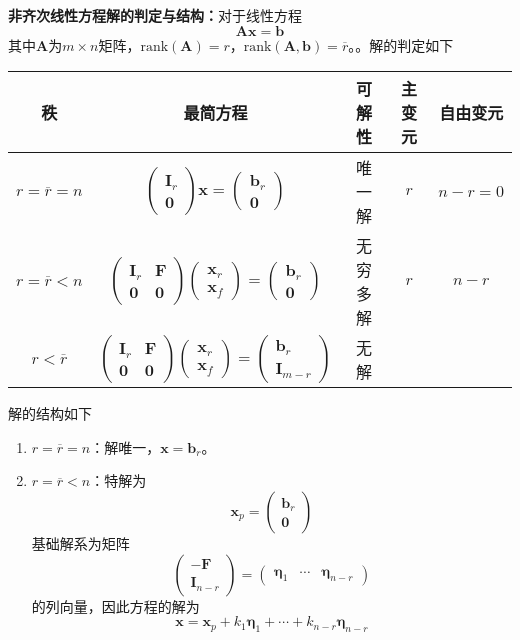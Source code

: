 \documentclass[lang = cn, scheme = chinese, thmcnt = section]{elegantbook}
\newcommand{\bs}{\boldsymbol}          %
\newcommand{\rank}{\text{rank}}        %
\begin{document}
\textbf{非齐次线性方程解的判定与结构：}对于线性方程
$$
\bs{Ax}=\bs{b}
$$
其中$\bs{A}$为$m\times n$矩阵，$\rank(\bs{A})=r$，$\rank(\bs{A},\bs{b})=\overline{r}$。。解的判定如下
\begin{table}[H]
	\centering
	\begin{tabular}{ccccc}
		\toprule
		秩 & 最简方程 & 可解性 & 主变元 & 自由变元 \\
		\midrule
		$r=\overline{r}=n$ & $\begin{pmatrix}\bs{I}_r\\\bs{0}\end{pmatrix}\bs{x}=\begin{pmatrix}\bs{b}_r\\\bs{0}\end{pmatrix}$ & 唯一解 & $r$ & $n-r=0$ \\
		$r=\overline{r}<n$ & $\begin{pmatrix}\bs{I}_r&\bs{F}\\\bs{0}&\bs{0}\end{pmatrix}\begin{pmatrix}\bs{x}_r\\\bs{x}_f\end{pmatrix}=\begin{pmatrix}\bs{b}_r\\\bs{0}\end{pmatrix}$ & 无穷多解 & $r$ & $n-r$ \\
		$r<\overline{r}$ & $\begin{pmatrix}\bs{I}_r&\bs{F}\\\bs{0}&\bs{0}\end{pmatrix}\begin{pmatrix}\bs{x}_r\\\bs{x}_f\end{pmatrix}=\begin{pmatrix}\bs{b}_r\\\bs{I}_{m-r}\end{pmatrix}$ & 无解 & & \\
		\bottomrule
	\end{tabular}
\end{table}
解的结构如下
\begin{enumerate}
	\item $r=\overline{r}=n$：解唯一，$\bs{x}=\bs{b}_r$。
	\item $r=\overline{r}<n$：特解为
	$$
	\bs{x}_p=
	\begin{pmatrix}
		\bs{b}_r\\
		\bs{0}
	\end{pmatrix}
	$$
	基础解系为矩阵
	$$
	\begin{pmatrix}
		-\bs{F}\\
		\bs{I}_{n-r}
	\end{pmatrix}
	=\begin{pmatrix}
		\bs{\eta}_1&\cdots&\bs{\eta}_{n-r}
	\end{pmatrix}
	$$
	的列向量，因此方程的解为
	$$
	\bs{x}=\bs{x}_p+k_1\bs{\eta}_1+\cdots+k_{n-r}\bs{\eta}_{n-r}
	$$
\end{enumerate}
\end{document}
